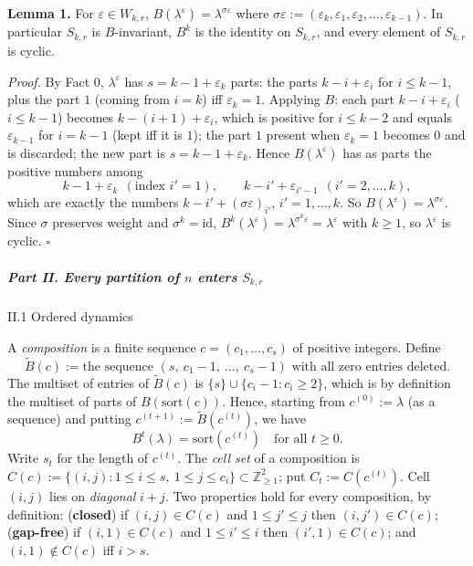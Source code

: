 \textbf{Lemma 1.} For \(\varepsilon\in W_{k,r}\),
\(B(\lambda^\varepsilon)=\lambda^{\sigma\varepsilon}\) where
\(\sigma\varepsilon:=(\varepsilon_k,\varepsilon_1,\varepsilon_2,\dots,\varepsilon_{k-1})\).
In particular \(S_{k,r}\) is \(B\)-invariant, \(B^k\) is the identity on
\(S_{k,r}\), and every element of \(S_{k,r}\) is cyclic.

\emph{Proof.} By Fact 0, \(\lambda^\varepsilon\) has
\(s=k-1+\varepsilon_k\) parts: the parts \(k-i+\varepsilon_i\) for
\(i\le k-1\), plus the part \(1\) (coming from \(i=k\)) iff
\(\varepsilon_k=1\). Applying \(B\): each part \(k-i+\varepsilon_i\)
(\(i\le k-1\)) becomes \(k-(i+1)+\varepsilon_i\), which is positive for
\(i\le k-2\) and equals \(\varepsilon_{k-1}\) for \(i=k-1\) (kept iff it
is \(1\)); the part \(1\) present when \(\varepsilon_k=1\) becomes \(0\)
and is discarded; the new part is \(s=k-1+\varepsilon_k\). Hence
\(B(\lambda^\varepsilon)\) has as parts the positive numbers among
\[k-1+\varepsilon_k\ \ (\text{index }i'=1),\qquad k-i'+\varepsilon_{i'-1}\ \ (i'=2,\dots,k),\]
which are exactly the numbers \(k-i'+(\sigma\varepsilon)_{i'}\),
\(i'=1,\dots,k\). So
\(B(\lambda^\varepsilon)=\lambda^{\sigma\varepsilon}\). Since \(\sigma\)
preserves weight and \(\sigma^k=\mathrm{id}\),
\(B^k(\lambda^\varepsilon)=\lambda^{\sigma^k\varepsilon}=\lambda^\varepsilon\)
with \(k\ge1\), so \(\lambda^\varepsilon\) is cyclic. \(\square\)

\subparagraph{\texorpdfstring{Part II. Every partition of \(n\) enters
\(S_{k,r}\)}{Part II. Every partition of n enters S\_\{k,r\}}}\label{part-ii.-every-partition-of-n-enters-s_kr}

II.1 Ordered dynamics

A \emph{composition} is a finite sequence \(c=(c_1,\dots,c_s)\) of
positive integers. Define
\[\tilde B(c):=\text{the sequence }(s,\ c_1-1,\ \dots,\ c_s-1)\text{ with all zero entries deleted}.\]
The multiset of entries of \(\tilde B(c)\) is
\(\{s\}\cup\{c_i-1:c_i\ge2\}\), which is by definition the multiset of
parts of \(B(\mathrm{sort}(c))\). Hence, starting from
\(c^{(0)}:=\lambda\) (as a sequence) and putting
\(c^{(t+1)}:=\tilde B(c^{(t)})\), we have
\[B^t(\lambda)=\mathrm{sort}(c^{(t)})\quad\text{for all }t\ge0. \tag{1}\]
Write \(s_t\) for the length of \(c^{(t)}\). The \emph{cell set} of a
composition is
\(C(c):=\{(i,j):1\le i\le s,\ 1\le j\le c_i\}\subset\mathbb Z_{\ge1}^2\);
put \(C_t:=C(c^{(t)})\). Cell \((i,j)\) lies on \emph{diagonal} \(i+j\).
Two properties hold for every composition, by definition:
(\textbf{closed}) if \((i,j)\in C(c)\) and \(1\le j'\le j\) then
\((i,j')\in C(c)\); (\textbf{gap-free}) if \((i,1)\in C(c)\) and
\(1\le i'\le i\) then \((i',1)\in C(c)\); and \((i,1)\notin C(c)\) iff
\(i>s\).

